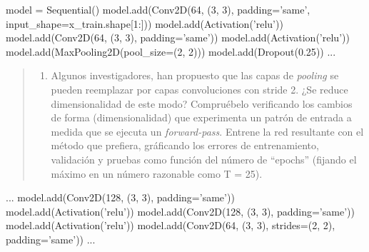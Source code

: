 \documentclass[11pt]{article}
\providecommand{\tightlist}{%
      \setlength{\itemsep}{0pt}\setlength{\parskip}{0pt}}
\newenvironment{Shaded}{}{}
\newcommand{\DecValTok}[1]{\textcolor[rgb]{0.25,0.63,0.44}{{#1}}}
\newcommand{\FloatTok}[1]{\textcolor[rgb]{0.25,0.63,0.44}{{#1}}}
\newcommand{\StringTok}[1]{\textcolor[rgb]{0.25,0.44,0.63}{{#1}}}
\newcommand{\NormalTok}[1]{{#1}}
\newcommand{\OperatorTok}[1]{\textcolor[rgb]{0.40,0.40,0.40}{{#1}}}
\begin{document}
\begin{Shaded}
\begin{Highlighting}[]
\NormalTok{model }\OperatorTok{=}\NormalTok{ Sequential()}
\NormalTok{model.add(Conv2D(}\DecValTok{64}\NormalTok{, (}\DecValTok{3}\NormalTok{, }\DecValTok{3}\NormalTok{), padding}\OperatorTok{=}\StringTok{'same'}\NormalTok{, input_shape}\OperatorTok{=}\NormalTok{x_train.shape[}\DecValTok{1}\NormalTok{:]))}
\NormalTok{model.add(Activation(}\StringTok{'relu'}\NormalTok{))}
\NormalTok{model.add(Conv2D(}\DecValTok{64}\NormalTok{, (}\DecValTok{3}\NormalTok{, }\DecValTok{3}\NormalTok{), padding}\OperatorTok{=}\StringTok{'same'}\NormalTok{))}
\NormalTok{model.add(Activation(}\StringTok{'relu'}\NormalTok{))}
\NormalTok{model.add(MaxPooling2D(pool_size}\OperatorTok{=}\NormalTok{(}\DecValTok{2}\NormalTok{, }\DecValTok{2}\NormalTok{)))}
\NormalTok{model.add(Dropout(}\FloatTok{0.25}\NormalTok{))}
\NormalTok{...}
\end{Highlighting}
\end{Shaded}

\begin{quote}
\begin{enumerate}
\def\labelenumi{\alph{enumi})}
\setcounter{enumi}{7}
\tightlist
\item
  Algunos investigadores, han propuesto que las capas de \emph{pooling}
  se pueden reemplazar por capas convoluciones con stride 2. ¿Se reduce
  dimensionalidad de este modo? Compruébelo verificando los cambios de
  forma (dimensionalidad) que experimenta un patrón de entrada a medida
  que se ejecuta un \emph{forward-pass}. Entrene la red resultante con
  el método que prefiera, gráficando los errores de entrenamiento,
  validación y pruebas como función del número de ``epochs'' (fijando el
  máximo en un número razonable como T = 25).
\end{enumerate}
\end{quote}

\begin{Shaded}
\begin{Highlighting}[]
\NormalTok{...}
\NormalTok{model.add(Conv2D(}\DecValTok{128}\NormalTok{, (}\DecValTok{3}\NormalTok{, }\DecValTok{3}\NormalTok{), padding}\OperatorTok{=}\StringTok{'same'}\NormalTok{))}
\NormalTok{model.add(Activation(}\StringTok{'relu'}\NormalTok{))}
\NormalTok{model.add(Conv2D(}\DecValTok{128}\NormalTok{, (}\DecValTok{3}\NormalTok{, }\DecValTok{3}\NormalTok{), padding}\OperatorTok{=}\StringTok{'same'}\NormalTok{))}
\NormalTok{model.add(Activation(}\StringTok{'relu'}\NormalTok{))}
\NormalTok{model.add(Conv2D(}\DecValTok{64}\NormalTok{, (}\DecValTok{3}\NormalTok{, }\DecValTok{3}\NormalTok{), strides}\OperatorTok{=}\NormalTok{(}\DecValTok{2}\NormalTok{, }\DecValTok{2}\NormalTok{), padding}\OperatorTok{=}\StringTok{'same'}\NormalTok{))}
\NormalTok{...}
\end{Highlighting}
\end{Shaded}
\end{document}
